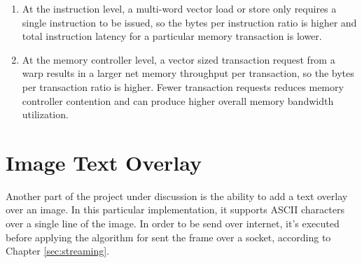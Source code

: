 \documentclass[paper=a4, fontsize=10pt]{scrartcl}	%
\begin{document}
	\begin{enumerate}
		\item At the instruction level, a multi-word vector load or store only requires a single instruction to be issued, so the bytes per instruction ratio is higher and total instruction latency for a particular memory transaction is lower.
		\item At the memory controller level, a vector sized transaction request from a warp results in a larger net memory throughput per transaction, so the bytes per transaction ratio is higher. Fewer transaction requests reduces memory controller contention and can produce higher overall memory bandwidth utilization.
	\end{enumerate}

	





\newpage
\section{Image Text Overlay}

	Another part of the project under discussion is the ability to add a text overlay over an image. In this particular implementation, it supports ASCII characters over a single line of the image. In order to be send over internet, it's executed before applying the algorithm for sent the frame over a socket, according to Chapter \ref{sec:streaming}.\\
\end{document}
